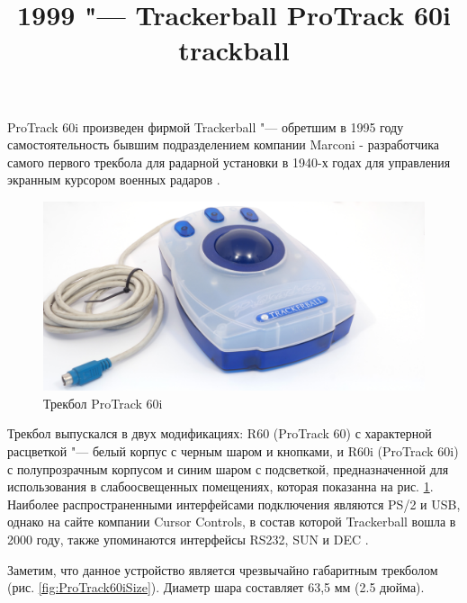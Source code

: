 \documentclass[11pt, a4paper]{article}
\begin{document}
\title{1999 "--- Trackerball ProTrack 60i trackball}
\date{}
\maketitle

ProTrack 60i произведен фирмой Trackerball "--- обретшим в 1995 году самостоятельность
бывшим подразделением компании Marconi - разработчика самого первого трекбола для радарной установки в 1940-х годах для управления экранным курсором военных радаров \cite{history}.

\begin{figure}[h]
    \centering
    \includegraphics[scale=0.3]{1999_protrack_60i/monstr1_30.jpg}
    \caption{Трекбол ProTrack 60i}
    \label{fig:ProTrack60i}
\end{figure}

Трекбол выпускался в двух модификациях: R60 (ProTrack 60) с характерной расцветкой "--- белый корпус с черным шаром и кнопками, и R60i (ProTrack 60i) с полупрозрачным корпусом и синим шаром с подсветкой, предназначенной для использования в слабоосвещенных помещениях, которая показанна на рис. \ref{fig:ProTrack60i}. Наиболее распространенными интерфейсами подключения являются PS/2 и USB, однако на сайте компании Cursor Controls, в состав которой Trackerball вошла в 2000 году,  также упоминаются интерфейсы RS232, SUN и DEC \cite{trackerball,cursorcontrols}.

Заметим, что данное устройство является чрезвычайно габаритным трекболом (рис. \ref{fig:ProTrack60iSize}). Диаметр шара составляет 63,5 мм (2.5 дюйма).
\end{document}
